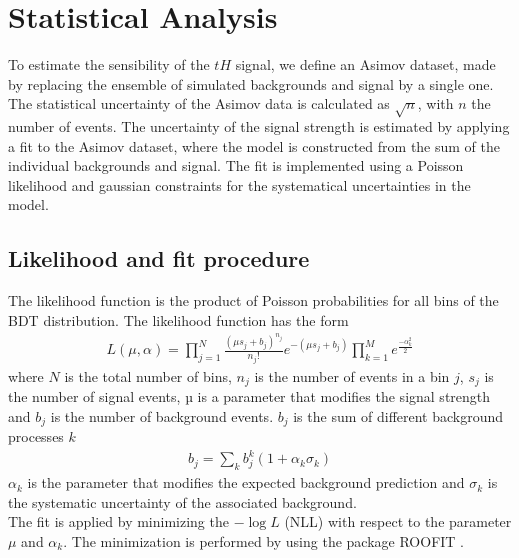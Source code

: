 \chapter{Statistical Analysis}
To estimate the sensibility of the $tH$ signal, we define an Asimov dataset, made by replacing the ensemble of simulated backgrounds and signal by a single one. The statistical uncertainty of the Asimov data is calculated as $\sqrt{n}$, with $n$ the number of events. The uncertainty of the signal strength is estimated by applying a  fit to the Asimov dataset, where the model
is constructed from the sum of the individual backgrounds and signal. The fit is implemented using a Poisson likelihood and gaussian constraints for the systematical uncertainties in the model.


\section{Likelihood and fit procedure}
The likelihood function is the product of Poisson probabilities for all bins of the BDT distribution. The likelihood function has the form
\begin{align}
L(\mu,\alpha)=\prod_{j=1}^{N}\frac{(\mu s_j +b_j)^{n_j}}{n_j !}e^{-(\mu s_j+b_j)} \prod_{k=1}^M e^{\frac{-\alpha^2_k}{2}}
\end{align}
where $N$ is the total number of bins, $n_j$ is the number of events in a bin $j$,  $s_j$ is the number of signal events, µ is a parameter that modifies the signal strength and  $b_j$ is the number of background events.
$b_j$ is the sum of different background processes $k$
\begin{align}
b_j=\sum_k b_j^k(1+ \alpha_k \sigma_k)
\end{align}
$\alpha_k$ is the parameter that modifies the expected background prediction and $\sigma_k$ is the systematic uncertainty of the associated background. \\

The fit is applied by minimizing the $-\log{L}$ (NLL) with respect to the parameter $\mu$ and $\alpha_k$. The minimization is performed by using the package ROOFIT \cite{roofit}.


